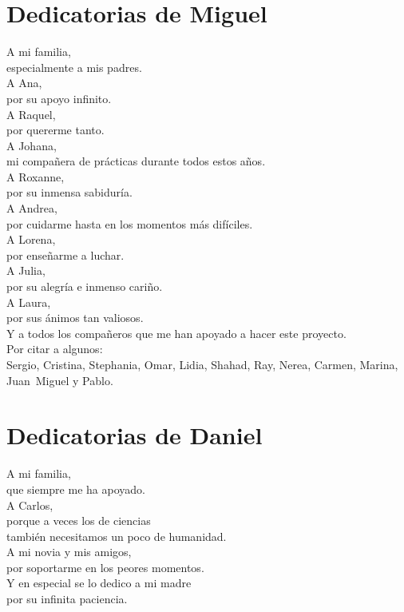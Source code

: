 \chapter*{Dedicatorias de Miguel}
\begin{center}
  A mi familia,\\
  especialmente a mis padres.\\[0.3cm]
  A Ana,\\
  por su apoyo infinito.\\[0.3cm]
  A Raquel,\\
  por quererme tanto.\\[0.3cm]
  A Johana,\\
  mi compañera de prácticas durante todos estos años.\\[0.3cm]
  A Roxanne,\\
  por su inmensa sabiduría.\\[0.3cm]
  A Andrea,\\
  por cuidarme hasta en los momentos más difíciles.\\[0.3cm]
  A Lorena,\\
  por enseñarme a luchar.\\[0.3cm]
  A Julia,\\
  por su alegría e inmenso cariño.\\[0.3cm]
  A Laura,\\
  por sus ánimos tan valiosos.\\[0.3cm]
  Y a todos los compañeros que me han apoyado a hacer este
  proyecto.\\
  Por citar a algunos:\\
  Sergio, Cristina, Stephania, Omar, Lidia, Shahad, Ray, Nerea, Carmen, Marina, \mbox{Juan
  Miguel} y Pablo.
\end{center}

\chapter*{Dedicatorias de Daniel}
\begin{center}
A mi familia,\\
que siempre me ha apoyado.\\[0.3cm]

A Carlos,\\
porque a veces los de ciencias \\
también necesitamos un poco de humanidad.\\[0.3cm]

A mi novia y mis amigos, \\
por soportarme en los peores momentos.\\[0.3cm]

Y en especial se lo dedico a mi madre\\
por su infinita paciencia.
\end{center}

